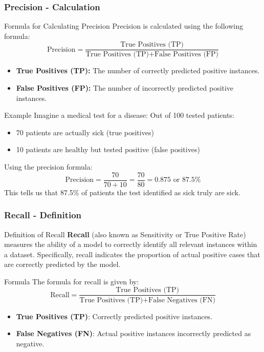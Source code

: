 \documentclass[aspectratio=169]{beamer}
\begin{document}
\begin{frame}[fragile]
    \frametitle{Precision - Calculation}
    \begin{block}{Formula for Calculating Precision}
        Precision is calculated using the following formula:
        \begin{equation}
            \text{Precision} = \frac{\text{True Positives (TP)}}{\text{True Positives (TP)} + \text{False Positives (FP)}}
        \end{equation}
        \begin{itemize}
            \item \textbf{True Positives (TP):} The number of correctly predicted positive instances.
            \item \textbf{False Positives (FP):} The number of incorrectly predicted positive instances.
        \end{itemize}
    \end{block}
    
    \begin{block}{Example}
        Imagine a medical test for a disease: Out of 100 tested patients:
        \begin{itemize}
            \item 70 patients are actually sick (true positives)
            \item 10 patients are healthy but tested positive (false positives)
        \end{itemize}
        Using the precision formula:
        \begin{equation}
            \text{Precision} = \frac{70}{70 + 10} = \frac{70}{80} = 0.875 \text{ or } 87.5\%
        \end{equation}
        This tells us that 87.5\% of patients the test identified as sick truly are sick.
    \end{block}
\end{frame}

\begin{frame}[fragile]
    \frametitle{Recall - Definition}
    \begin{block}{Definition of Recall}
        \textbf{Recall} (also known as Sensitivity or True Positive Rate) measures the ability of a model to correctly identify all relevant instances within a dataset. Specifically, recall indicates the proportion of actual positive cases that are correctly predicted by the model.
    \end{block}
    
    \begin{block}{Formula}
        The formula for recall is given by:
        \[
        \text{Recall} = \frac{\text{True Positives (TP)}}{\text{True Positives (TP)} + \text{False Negatives (FN)}}
        \]
        \begin{itemize}
            \item \textbf{True Positives (TP)}: Correctly predicted positive instances.
            \item \textbf{False Negatives (FN)}: Actual positive instances incorrectly predicted as negative.
        \end{itemize}
    \end{block}
\end{frame}
\end{document}
